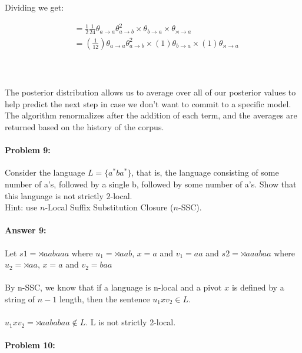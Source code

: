 \documentclass[10pt]{article}
\begin{document}
Dividing we get:

\begin{equation*}
\begin{aligned}
&= {\frac{1}{2}}{\frac {1}{24}}\theta_{a \rightarrow a}\theta_{a \rightarrow b}^2
\times
\theta_{b \rightarrow a}
\times
\theta_{\rtimes \rightarrow a}
\\
&= ({\frac {1}{12}})\theta_{a \rightarrow a}\theta_{a \rightarrow b}^2
\times
(1)\theta_{b \rightarrow a}
\times
(1)\theta_{\rtimes \rightarrow a}
\\
\end{aligned}
\end{equation*}

\\
\\
The posterior distribution allows us to average over all of our posterior values to help predict the next step in case we don't want to commit to a specific model. The algorithm renormalizes after the addition of each term, and the averages are returned based on the history of the corpus. 

\hrulefill
\paragraph{Problem 9:}

Consider the language $L=\{a^* b a^*\}$, that is, the language
consisting of some number of a's, followed by a single b, followed by
some number of a's. Show that this language is not strictly
$2$-local.\\

\noindent Hint: use $n$-Local Suffix Substitution Closure ($n$-SSC).

\paragraph{Answer 9:}

Let $s1 = \rtimes aabaaa$ where $u_1 = \rtimes aab$, $x = a$ and $v_1 = aa$
and $s2 = \rtimes aaabaa$ where $u_2 = \rtimes aa$, $x = a$ and $v_2 = baa$
\\
\\
By n-SSC, we know that if a language is n-local and a pivot $x$ is defined by a string of $n-1$ length, then the sentence $u_1 x v_2 \in L$.
\\
\\
$u_1 x v_2 = \rtimes aababaa \notin L$. L is not strictly 2-local. 


\hrulefill
\paragraph{Problem 10:}
\end{document}
